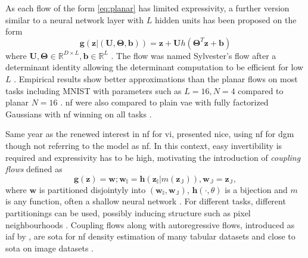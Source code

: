 \documentclass[12pt,fleqn,twocolumn]{article}
\newcommand{\RR}{\ensuremath{\mathbb R}}
\begin{document}
As each flow of the form \eqref{eq:planar} has limited expressivity, a further version similar to a neural network layer with $L$ hidden units has been proposed on the form
\begin{equation}
    \mathbf g(\mathbf z | (\mathbf U, \bm \Theta, \mathbf b)) = \mathbf z + \mathbf U h \left(\bm \Theta ^T \mathbf z + \mathbf b\right)
\end{equation}
where $\mathbf U, \bm \Theta \in \RR^{D\times L}, \mathbf b\in \RR^L$ \cite[Chap. 3]{Berg2018SylvesterNF}.
The flow was named Sylvester's flow after a determinant identity allowing the determinant computation to be efficient for low $L$ \cite[Theorem 1]{Berg2018SylvesterNF}.
Empirical results show better approximations than the planar flows on most tasks including MNIST with parameters such as $L=16, N=4$ compared to planar $N=16$ \cite[Tab. 3]{Berg2018SylvesterNF}.
\acrshort{nf} were also compared to plain \acrfull{vae} with fully factorized Gaussians with \acrshort{nf} winning on all tasks \cite[Tab. 1, Tab.2]{Berg2018SylvesterNF}.

Same year as the renewed interest in \acrshort{nf} for \acrshort{vi}, \textcite{Dinh2015NICENI} presented \acrfull{nice}, using \acrshort{nf} for \acrshort{dgm} though not referring to the model as \acrshort{nf}.
In this context, easy invertibility is required and expressivity has to be high, motivating the introduction of \emph{coupling flows} defined as
\begin{equation}
    \mathbf g(\mathbf z)  = \mathbf w; \mathbf w_{\mathbb I}=\mathbf h(\mathbf z_{\mathbb I} | m(\mathbf z_{\mathbb J})), \mathbf w_{\mathbb J} = \mathbf z_\mathbb J,
\end{equation}
where $\mathbf w$ is partitioned disjointyly into $(\mathbf w_\mathbb I, \mathbf w_\mathbb J)$, $\mathbf h(\cdot, \theta)$ is a bijection and $m$ is any function, often a shallow neural network \cite[Chap. 3]{Dinh2015NICENI}\cite[Chap. 3.4]{koby2021nf}.
For different tasks, different partitionings can be used, possibly inducing structure such as pixel neighbourhoods \cite[Chap. 3.4]{koby2021nf}. 
Coupling flows along with autoregressive flows, introduced as \acrfull{iaf} by \textcite{Kingma2017ImprovedVI}, are \acrfull{sota} for \acrshort{nf} density estimation of many tabular datasets \cite[Tab. 2]{koby2021nf} and close to \acrshort{sota} on image datasets \cite[Tab. 3]{koby2021nf}.
\end{document}
